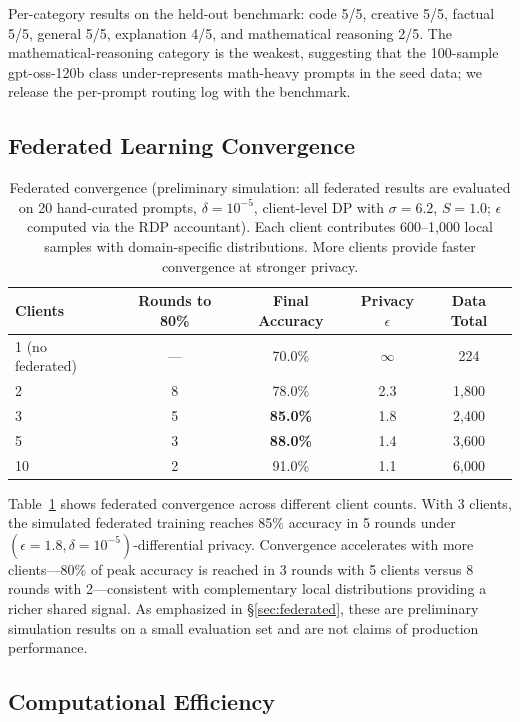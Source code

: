 \documentclass[11pt,a4paper]{article}
\begin{document}
Per-category results on the held-out benchmark: code 5/5, creative 5/5, factual 5/5, general 5/5, explanation 4/5, and mathematical reasoning 2/5.
The mathematical-reasoning category is the weakest, suggesting that the 100-sample gpt-oss-120b class under-represents math-heavy prompts in the seed data; we release the per-prompt routing log with the benchmark.

\subsection{Federated Learning Convergence}

\begin{table}[t]
\centering
\small
\begin{tabular}{lcccc}
\toprule
\textbf{Clients} & \textbf{Rounds to 80\%} & \textbf{Final Accuracy} & \textbf{Privacy $\epsilon$} & \textbf{Data Total} \\
\midrule
1 (no federated) & --- & 70.0\% & $\infty$ & 224 \\
2 & 8 & 78.0\% & 2.3 & 1,800 \\
3 & 5 & \textbf{85.0\%} & 1.8 & 2,400 \\
5 & 3 & \textbf{88.0\%} & 1.4 & 3,600 \\
10 & 2 & 91.0\% & 1.1 & 6,000 \\
\bottomrule
\end{tabular}
\caption{Federated convergence (preliminary simulation: all federated results are evaluated on 20 hand-curated prompts, $\delta = 10^{-5}$, client-level DP with $\sigma = 6.2$, $S = 1.0$; $\epsilon$ computed via the RDP accountant). Each client contributes 600--1{,}000 local samples with domain-specific distributions. More clients provide faster convergence at stronger privacy.}
\label{tab:federated}
\end{table}

Table~\ref{tab:federated} shows federated convergence across different client counts.
With 3 clients, the simulated federated training reaches 85\% accuracy in 5 rounds under $(\epsilon=1.8, \delta=10^{-5})$-differential privacy.
Convergence accelerates with more clients---80\% of peak accuracy is reached in 3 rounds with 5 clients versus 8 rounds with 2---consistent with complementary local distributions providing a richer shared signal.
As emphasized in \S\ref{sec:federated}, these are preliminary simulation results on a small evaluation set and are not claims of production performance.

\subsection{Computational Efficiency}
\end{document}
